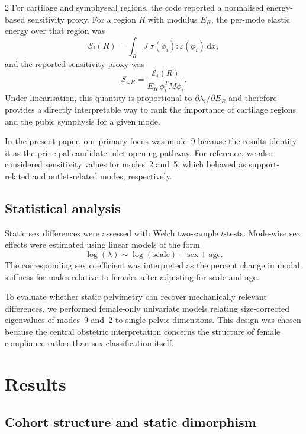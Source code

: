 \documentclass[openacc]{rsproca_new}
\begin{document}
\begin{multicols}{2}
For cartilage and symphyseal regions, the code reported a normalised energy-based sensitivity proxy. For a region $R$ with modulus $E_{R}$, the per-mode elastic energy over that region was
\begin{equation}
\mathcal{E}_{i}(R)=\int_{R} J\,\sigma(\phi_{i}):\varepsilon(\phi_{i})\,\mathrm{d}x,
\end{equation}
and the reported sensitivity proxy was
\begin{equation}
S_{i,R}=\frac{\mathcal{E}_{i}(R)}{E_{R}\,\phi_{i}^{T}M\phi_{i}}.
\end{equation}
Under linearisation, this quantity is proportional to $\partial \lambda_{i}/\partial E_{R}$ and therefore provides a directly interpretable way to rank the importance of cartilage regions and the pubic symphysis for a given mode.

In the present paper, our primary focus was mode~9 because the results identify it as the principal candidate inlet-opening pathway. For reference, we also considered sensitivity values for modes~2 and~5, which behaved as support-related and outlet-related modes, respectively.

\subsection{Statistical analysis}

Static sex differences were assessed with Welch two-sample $t$-tests. Mode-wise sex effects were estimated using linear models of the form
\begin{equation}
\log(\lambda) \sim \log(\mathrm{scale}) + \mathrm{sex} + \mathrm{age}.
\end{equation}
The corresponding sex coefficient was interpreted as the percent change in modal stiffness for males relative to females after adjusting for scale and age.

To evaluate whether static pelvimetry can recover mechanically relevant differences, we performed female-only univariate models relating size-corrected eigenvalues of modes~9 and~2 to single pelvic dimensions. This design was chosen because the central obstetric interpretation concerns the structure of female compliance rather than sex classification itself.

\section{Results}


\subsection{Cohort structure and static dimorphism}


\end{multicols}
\end{document}
